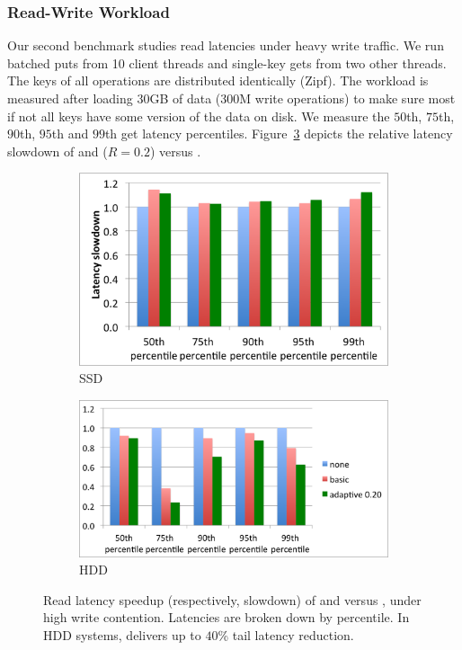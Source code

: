 \subsubsection{Read-Write Workload}

Our second benchmark studies read latencies under heavy write traffic. 
We run batched puts from 10 client threads and single-key gets from two other threads. 
The keys of all operations are distributed identically (Zipf). The workload is measured after loading 30GB of data (300M write operations) to make sure most if not all keys have some version of the data on disk. We measure the $50$th, 
$75$th, $90$th, $95$th and $99$th get latency percentiles. Figure~\ref{fig:latency} 
depicts the relative latency slowdown of \basic\/ and \adp\/ ($R=0.2$) versus \none.

\begin{figure}[t]
  \centering
  
  \begin{subfigure}[t]{.9\columnwidth}
      \includegraphics[width=\figw]{Figs/latency-ssd.png}
      \caption[]{SSD}
    \label{fig:latency:ssd}
  \end{subfigure}
  \begin{subfigure}[t]{1.1\columnwidth}
      \includegraphics[width=\figw]{Figs/latency-hdd.png}
      \caption[]{HDD}
    \label{fig:latency:hdd}
  \end{subfigure}

  \caption{Read latency speedup (respectively, slowdown) of \basic\/ and \adp\/ versus \none, under high write contention.
  Latencies are broken down by percentile. In HDD systems, \adp\/ delivers up to $40$\% tail latency reduction. 
  }
  
  \label{fig:latency}
\end{figure}


